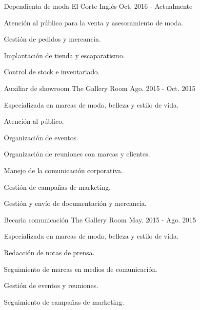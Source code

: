 

\begin{cventries}

  \cventry
    {Dependienta de moda} %
    {El Corte Inglés} %
    {} %
    {Oct. 2016 - Actualmente} %
    {
      \begin{cvitems} %
        \item {Atención al público para la venta y asesoramiento de moda.}
        \item {Gestión de pedidos y mercancía.}
        \item {Implantación de tienda y escaparatismo.}
        \item {Control de stock e inventariado.}
      \end{cvitems}
    }

  \cventry
    {Auxiliar de showroom} %
    {The Gallery Room} %
    {} %
    {Ago. 2015 - Oct. 2015} %
    {
      \begin{cvitems} %
        \item {Especializada en marcas de moda, belleza y estilo de vida.}
        \item {Atención al público.}
        \item {Organización de eventos.}
        \item {Organización de reuniones con marcas y clientes.}
        \item {Manejo de la comunicación corporativa.}
        \item {Gestión de campañas de marketing.}
        \item {Gestión y envío de documentación y mercancía.}
      \end{cvitems}
    }

  \cventry
    {Becaria comunicación} %
    {The Gallery Room} %
    {} %
    {May. 2015 - Ago. 2015} %
    {
      \begin{cvitems} %
        \item {Especializada en marcas de moda, belleza y estilo de vida.}
        \item {Redacción de notas de prensa.}
        \item {Seguimiento de marcas en medios de comunicación.}
        \item {Gestión de eventos y reuniones.}
        \item {Seguimiento de campañas de marketing.}
      \end{cvitems}
    }


\end{cventries}
